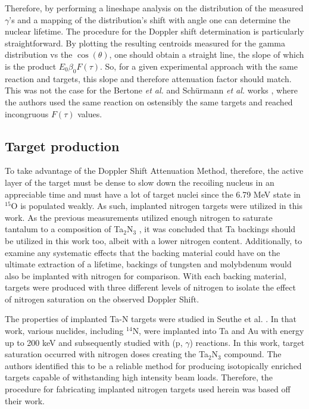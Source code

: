 Therefore, by performing a lineshape analysis on the distribution of the measured $\gamma$'s and a mapping of the distribution's shift with angle one can determine the nuclear lifetime. The procedure for the Doppler shift determination is particularly straightforward. By plotting the resulting centroids measured for the gamma distribution vs the $\cos(\theta)$, one should obtain a straight line, the slope of which is the product $E_{0} \beta_{0} F(\tau)$. So, for a given experimental approach with the same reaction and targets, this slope and therefore attenuation factor should match. This was not the case for the Bertone \textit{et al.} and Sch{\"u}rmann \textit{et al.} works \cite{Bertone2001, Schurmann2008}, where the authors used the same reaction on ostensibly the same targets and reached incongruous $F(\tau)$ values. 
 

\subsection{Target production}
\label{sec: implantation}

To take advantage of the Doppler Shift Attenuation Method, therefore, the active layer of the target must be dense to slow down the recoiling nucleus in an appreciable time and must have a lot of target nuclei since the 6.79 MeV state in $^{15}$O is populated weakly. As such, implanted nitrogen targets were utilized in this work. As the previous measurements utilized enough nitrogen to saturate tantalum to a composition of Ta$_{2}$N$_{3}$ \cite{Bertone2001, Schurmann2008}, it was concluded that Ta backings should be utilized in this work too, albeit with a lower nitrogen content. Additionally, to examine any systematic effects that the backing material could have on the ultimate extraction of a lifetime, backings of tungsten and molybdenum would also be implanted with nitrogen for comparison. With each backing material, targets were produced with three different levels of nitrogen to isolate the effect of nitrogen saturation on the observed Doppler Shift. 

The properties of implanted Ta-N targets were studied in Seuthe et al. \cite{Seuthe1987}. In that work, various nuclides, including $^{14}$N, were implanted into Ta and Au with energy up to 200 keV and subsequently studied with (p, $\gamma$) reactions. In this work, target saturation occurred with nitrogen doses creating the Ta$_{2}$N$_{3}$ compound. The authors identified this to be a reliable method for producing isotopically enriched targets capable of withstanding high intensity beam loads. Therefore, the procedure for fabricating implanted nitrogen targets used herein was based off their work.

